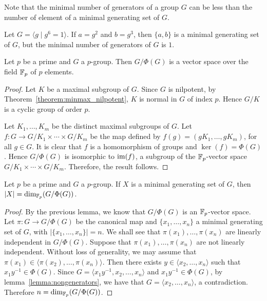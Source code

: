 Note that the minimal number of generators of a group $G$ can be less than the number of element of a minimal generating set of $G$.
	
\begin{example}
	Let $G=\langle g\mid g^6=1\rangle$.  If $a=g^2$ and
	$b=g^3$, then $\{a,b\}$ is a minimal generating set of $G$,
	but the minimal number of generators of $G$ is $1$.
\end{example}
	
\begin{lemma}
	\label{lemma:Burnside:minimal}
	Let $p$ be a prime and 
	$G$ a $p$-group. Then $G/\Phi(G)$ is a vector space over the field $\mathbb{F}_p$ of $p$ elements.
\end{lemma}

\begin{proof}
	Let $K$ be a maximal subgroup of $G$. Since $G$ is nilpotent, by Theorem~\ref{theorem:minmax_nilpotent}, 
	$K$ is normal in $G$ of index $p$. Hence $G/K$ is a cyclic group of order $p$. 
	
    Let $K_1,\dots,K_m$ be the distinct maximal subgroups of $G$.
    Let $f\colon G\rightarrow G/K_1\times\cdots\times G/K_m$ be the map defined by $f(g)=(gK_1,\dots ,gK_m)$, for all $g\in G$.
    It is clear that $f$ is a homomorphism of groups and $\ker(f)=\Phi(G)$. Hence $G/\Phi(G)$ is isomorphic to $\operatorname{im}(f)$, a subgroup of 
    the $\mathbb{F}_p$-vector space $G/K_1\times\cdots\times G/K_m$. Therefore, the result follows.
\end{proof}

\begin{theorem}[Burnside]
	\label{theorem:Burnside:basis}
	Let $p$ be a prime and  $G$ a $p$-group. If $X$ is a minimal generating set of $G$, then $|X|=\dim_{\mathbb{F}_p} (G/\Phi(G))$. 
\end{theorem}


\begin{proof}
	By the previous lemma, we know that $G/\Phi(G)$ is an $\mathbb{F}_p$-vector space. Let $\pi\colon G\to G/\Phi(G)$ be the canonical map
	and $\{x_1,\dots,x_n\}$ a minimal generating set of $G$, with $|\{x_1,\dots,x_n\}|=n$.
	We shall see that $\pi(x_1),\dots,\pi(x_n)$ are linearly independent in $G/\Phi(G)$.  Suppose that
	$\pi(x_1),\dots,\pi(x_n)$ are not linearly independent. Without loss of generality, we may assume that
	$\pi(x_1)\in\langle \pi(x_2),\dots,\pi(x_n)\rangle$. Then there exists $y\in
	\langle x_2,\dots,x_n\rangle$ such that $x_1y^{-1}\in\Phi(G)$. Since $G=\langle x_1y^{-1},x_2,\dots,x_n\rangle$ and $x_1y^{-1}\in\Phi(G)$, by lemma~\ref{lemma:nongenerators}, we have that $G=\langle x_2,\dots, x_n\rangle$, a contradiction.
	Therefore $n=\dim_{\mathbb{F}_p}(G/\Phi(G))$.
\end{proof}

